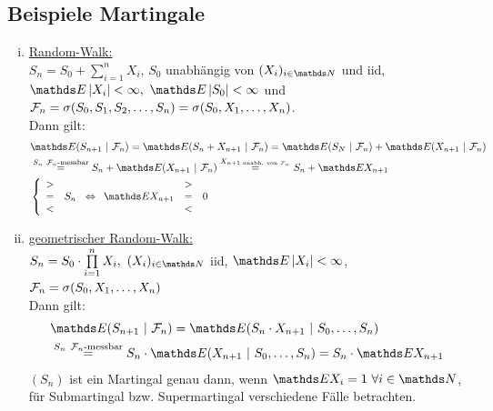 \subsection{Beispiele Martingale}
\label{sub:bsp_martingale}
\begin{enumerate}[(i)]
	\item \uline{Random-Walk:}\\
	$S_n=S_0+\sum\limits_{i=1}^{n}X_i$, $S_0$ unabhängig von $(X_i)_{i\in \N}$ und iid, $\E\abs{X_i}<\infty,~\E\abs{S_0}<\infty$ und $\mathcal{F}_n=\sigma(S_0,S_1,S_2,\dots,S_n)=\sigma(S_0,X_1,\dots,X_n)$.\\
	Dann gilt:
	\begin{equation*}
	\begin{aligned}
		&\E(S_{n+1}~|~\F_n) = \E(S_n+X_{n+1}~|~\F_n) = \E(S_N~|~\F_n)+\E(X_{n+1}~|~\F_n)\\
		&\stackrel{S_n~\F_n\text{-messbar}}{=} S_n+\E(X_{n+1}~|~\F_n)\stackrel{X_{n+1\text{ unabh. von }\F_n}}{=}S_n+\E X_{n+1}\\
		&\left\{\begin{array}{lc} > & \\ = & S_n \\ < &   \end{array}\right. \Leftrightarrow \begin{array}{ccc}  & > & \\ \E X_{n+1} & = & 0\\ & < & \end{array}
	\end{aligned}
	\end{equation*}
	\item \uline{geometrischer Random-Walk:}\\
	$S_n=S_0\cdot\prod\limits_{i=1}^{n}X_i,~(X_i)_{i\in \N}$ iid, $\E\abs{X_i}<\infty$, $\mathcal{F}_n=\sigma(S_0,X_1,\dots,X_n)$\\
	Dann gilt:
	\begin{equation*}
	\begin{aligned}
		&\E(S_{n+1}~|~\F_n) = \E(S_n\cdot X_{n+1}~|~S_0,\dots,S_n)\\
		&\stackrel{S_n~\F_n\text{-messbar}}{=} S_n\cdot\E(X_{n+1}~|~S_0,\dots,S_n)=S_n\cdot\E X_{n+1}
	\end{aligned}
	\end{equation*}
	$(S_n)$ ist ein Martingal genau dann, wenn $\E X_i=1~\forall i\in \N$, für Submartingal bzw. Supermartingal verschiedene Fälle betrachten.
\end{enumerate}








\cleardoubleoddemptypage
{}
\setcounter{page}{1}



\printindex
\listoffigures
